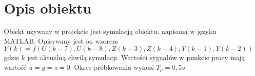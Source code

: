 \chapter{Opis obiektu}
\label{sec:opis}
Obiekt używany w projekcie jest symulacją obiektu, napisaną w języku MATLAB.
Opisywany jest on wzorem
\begin{equation}
  Y(k) = f(U(k - 7), U(k - 8), Z(k - 3), Z(k - 4), Y(k - 1), Y(k - 2))
\end{equation}
gdzie $k$ jest aktualną chwilą symulacji.
Wartości sygnałów w punkcie pracy mają wartość $u=y=z=0$. Okres próbkowania wynosi $T_p=0,5s$